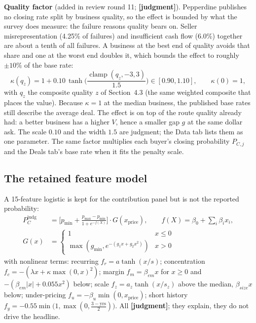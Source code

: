 \documentclass[11pt]{article}
\DeclareMathOperator{\clamp}{clamp}
\newcommand{\jud}{\textbf{[judgment]}}
\begin{document}
\textbf{Quality factor} (added in review round 11; \jud). Pepperdine publishes no closing rate split by business quality, so the effect is bounded by what the survey does measure: the failure reasons quality bears on. Seller misrepresentation (4.25\% of failures) and insufficient cash flow (6.0\%) together are about a tenth of all failures. A business at the best end of quality avoids that share and one at the worst end doubles it, which bounds the effect to roughly $\pm10\%$ of the base rate:
\begin{equation}
\kappa(q_z)=1+0.10\,\tanh\!\Big(\frac{\clamp(q_z,-3,3)}{1.5}\Big)\in[0.90,1.10],\qquad \kappa(0)=1,
\end{equation}
with $q_z$ the composite quality $z$ of Section~4.3 (the same weighted composite that places the value). Because $\kappa=1$ at the median business, the published base rates still describe the average deal. The effect is on top of the route quality already had: a better business has a higher $V$, hence a smaller gap $g$ at the same dollar ask. The scale $0.10$ and the width $1.5$ are judgment; the Data tab lists them as one parameter. The same factor multiplies each buyer's closing probability $P_{C,j}$ and the Deals tab's base rate when it fits the penalty scale.

\subsection{The retained feature model}
A 15-feature logistic is kept for the contribution panel but is not the reported probability:
\begin{equation}
\begin{aligned}P_C^{\text{judg}}&=\Big[p_{\min}+\tfrac{p_{\max}-p_{\min}}{1+e^{-f(X)}}\Big]\cdot G(x_{\text{price}}),\qquad f(X)=\beta_0+\sum_i\beta_ix_i,\\ G(x)&=\begin{cases}1&x\le0\\ \max(g_{\min},e^{-(g_1x+g_2x^2)})&x>0\end{cases}\end{aligned}
\end{equation}
with nonlinear terms: recurring $f_r=a\tanh(x/s)$; concentration $f_c=-(\lambda x+\kappa\max(0,x)^2)$; margin $f_m=\beta_{em}x$ for $x\ge0$ and $-(\beta_{em}|x|+0.055x^2)$ below; scale $f_z=a_z\tanh(x/s_z)$ above the median, $\beta_{size}x$ below; under-pricing $f_u=-\beta_u\min(0,x_{\text{price}})$; short history $f_y=-0.55\min\!\big(1,\max(0,\tfrac{3-\text{yrs}}{2})\big)$. All \jud; they explain, they do not drive the headline.
\end{document}
